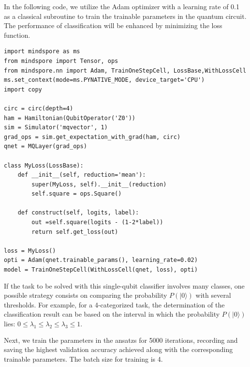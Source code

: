 In the following code, we utilize the Adam optimizer with a learning rate of 0.1 as a classical subroutine to train the trainable parameters in the quantum circuit. The performance of classification will be enhanced  by minimizing the loss function.


\begin{lstlisting}
import mindspore as ms
from mindspore import Tensor, ops
from mindspore.nn import Adam, TrainOneStepCell, LossBase,WithLossCell
ms.set_context(mode=ms.PYNATIVE_MODE, device_target='CPU')
import copy

circ = circ(depth=4)
ham = Hamiltonian(QubitOperator('Z0'))
sim = Simulator('mqvector', 1)
grad_ops = sim.get_expectation_with_grad(ham, circ)
qnet = MQLayer(grad_ops)

class MyLoss(LossBase):
    def __init__(self, reduction='mean'):
        super(MyLoss, self).__init__(reduction)
        self.square = ops.Square()

    def construct(self, logits, label):
        out =self.square(logits - (1-2*label))
        return self.get_loss(out)
    
loss = MyLoss()
opti = Adam(qnet.trainable_params(), learning_rate=0.02)  
model = TrainOneStepCell(WithLossCell(qnet, loss), opti)

\end{lstlisting}
If the task to be solved  with this single-qubit classifier involves many classes, one possible strategy consists on comparing the probability $P(|0\rangle)$  with several thresholds. For example, for a 4-categorized task, the determination of the classification result can be based on the interval in which the probability $P(|0\rangle)$ lies: $0\leqslant\lambda_1\leqslant\lambda_2\leqslant\lambda_3\leqslant1$.

Next, we train the parameters in the ansatzs  for 5000 iterations, recording and saving the highest validation accuracy achieved along with the corresponding trainable parameters. The batch size for training is 4.


